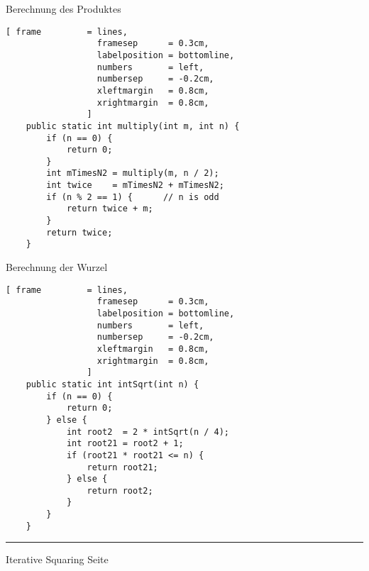 \documentclass{slides}
\newcommand{\Oh}{\mathcal{O}}
\newcounter{mypage}
\begin{document}
\begin{slide}{}
\begin{center}
Berechnung des Produktes 
\end{center}

\footnotesize

\begin{Verbatim}[ frame         = lines, 
                  framesep      = 0.3cm, 
                  labelposition = bottomline,
                  numbers       = left,
                  numbersep     = -0.2cm,
                  xleftmargin   = 0.8cm,
                  xrightmargin  = 0.8cm,
                ]
    public static int multiply(int m, int n) {
        if (n == 0) {
            return 0;
        }
        int mTimesN2 = multiply(m, n / 2); 
        int twice    = mTimesN2 + mTimesN2; 
        if (n % 2 == 1) {      // n is odd
            return twice + m; 
        }
        return twice;         
    }
\end{Verbatim}

\normalsize
\begin{center}
Berechnung der Wurzel
\end{center}
 \footnotesize

\begin{Verbatim}[ frame         = lines, 
                  framesep      = 0.3cm, 
                  labelposition = bottomline,
                  numbers       = left,
                  numbersep     = -0.2cm,
                  xleftmargin   = 0.8cm,
                  xrightmargin  = 0.8cm,
                ]
    public static int intSqrt(int n) {
        if (n == 0) {
            return 0;
        } else {
            int root2  = 2 * intSqrt(n / 4);    
            int root21 = root2 + 1;
            if (root21 * root21 <= n) {
                return root21;  
            } else {
                return root2;   
            }
        }
    }   
\end{Verbatim}


\vspace*{\fill}
\tiny \addtocounter{mypage}{1}
\rule{17cm}{1mm}
Iterative Squaring \hspace*{\fill} Seite 
\end{slide}


\end{document}
